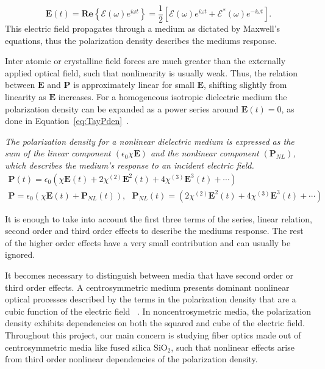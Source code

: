 \begin{equation}
\textbf{E}(t)= \textbf{Re}\left\{\mathcal{E}(\omega)e^{i\omega t}\right\}=\frac{1}{2}\left[\mathcal{E}(\omega)e^{i\omega t}+\mathcal{E}^*(\omega)e^{-i\omega t}\right].\label{eq:elfield}
\end{equation}
This electric field propagates through a medium as dictated by Maxwell's equations, thus the polarization density describes the mediums response. 

Inter atomic or crystalline field forces are much greater than the externally applied optical field, such that nonlinearity is usually weak. Thus, the relation between $\textbf{E}$ and $\textbf{P}$ is  approximately linear for small $\textbf{E}$, shifting slightly from linearity as $\textbf{E}$ increases. For a homogeneous isotropic dielectric medium the polarization density can be expanded as a power series around $\textbf{E}(t)=0$,  as done in Equation~\ref{eq:TayPden}~\cite{FundPhoto}.


\begin{tcolorbox}[title=Nonlinear Polarization Density Frequency Response]
\emph{The polarization density for a nonlinear dielectric medium is expressed as the sum of the linear component $(\epsilon_0\chi\textbf{E})$ and the nonlinear component $(\textbf{P}_{NL})$, which describes the medium's response to an incident electric field. }
\begin{subequations}
\begin{gather}
\textbf{P}(t)=\epsilon_0\left(\chi\textbf{E}(t)+2\chi^{(2)}\textbf{E}^2(t)+4\chi^{(3)}\textbf{E}^3(t)+\dotsm\right)\label{eq:TayPden}\\
\textbf{P}=\epsilon_0\left(\chi\textbf{E}(t)+\textbf{P}_{NL}(t)\right) , \ \ \ \textbf{P}_{NL}(t)=\left(2\chi^{(2)}\textbf{E}^2(t)+4\chi^{(3)}\textbf{E}^3(t)+\dotsm\right)
\end{gather}
\end{subequations}
\end{tcolorbox}
It is enough to take into account the first three terms  of the series, linear relation, second order and third order effects to describe the mediums response. The rest of the higher order effects have a very small contribution and can usually be ignored. 

It becomes necessary to distinguish between media that have second order or third order effects. A centrosymmetric medium presents dominant nonlinear optical processes described by the terms in the polarization density that are a cubic function of the electric field ~\cite{levenson1974dispersion}. In noncentrosymetric media, the polarization density exhibits dependencies on both the  squared and cube of the electric field. Throughout this project, our main concern is studying fiber optics made out of centrosymmetric media like fused silica SiO$_2$, such that nonlinear effects arise from third order nonlinear dependencies of the polarization density.

